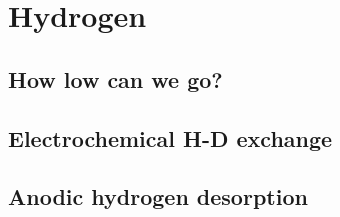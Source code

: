 
\chapter{Hydrogen}



\section{How low can we go?}



\section{Electrochemical H-D exchange}



\section{Anodic hydrogen desorption}



